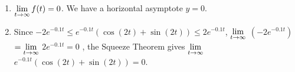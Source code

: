 \begin{enumerate}
\begin{enumerate}
\item $\displaystyle{\lim_{t \rightarrow \infty} f(t) = 0}$.   We have a horizontal asymptote $y = 0$.

\smallskip

\item   Since   $-2 e^{-0.1t}  \leq e^{-0.1t} \left( \cos(2t) + \sin(2t)\right) \leq 2 e^{-0.1t}$,   $\displaystyle{\lim_{t \rightarrow \infty}}$  $\left(- 2 e^{-0.1t}\right)$ $ = \displaystyle{\lim_{t \rightarrow \infty}}$ $2 e^{-0.1t}=0$ , the Squeeze Theorem gives  $\displaystyle{\lim_{t \rightarrow \infty}}$ $ e^{-0.1t} \left( \cos(2t) + \sin(2t)\right) = 0$.


\end{enumerate}

\smallskip


\setcounter{HW}{\value{enumi}}

\end{enumerate}



